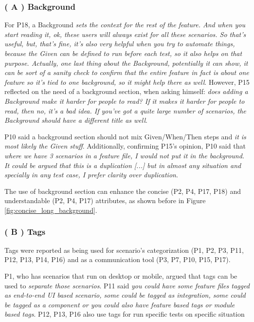 \subsubsection{\textbf{( A ) Background}}
For P18, a Background \textit{sets the context for the rest of the feature. And when you start reading it, ok, these users will always exist for all these scenarios. So that's useful, but, that's fine, it's also very helpful when you try to automate things, because the Given can be defined to run before each test, so it also helps on that purpose. Actually, one last thing about the Background, potentially it can show, it can be sort of a sanity check to confirm that the entire feature in fact is about one feature so it's tied to one background, so it might help there as well}. However, P15 reflected on the need of a background section, when asking himself: \textit{does adding a Background make it harder for people to read? If it makes it harder for people to read, then no, it's a bad idea. If you've got a quite large number of scenarios, the Background should have a different title as well}. 

P10 said a background section should not mix Given/When/Then steps and \textit{it is most likely the Given stuff}. Additionally, confirming P15's opinion, P10 said that \textit{where we have 3 scenarios in a feature file, I would not put it in the background. It could be argued that this is a duplication [...] but in almost any situation and specially in any test case, I prefer clarity over duplication}.

The use of background section can enhance the concise (P2, P4, P17, P18) and understandable (P2, P4, P17) attributes, as shown before in Figure \ref{fig:concise_long_background}.

\subsubsection{\textbf{( B ) Tags}}
Tags were reported as being used for scenario's categorization (P1, P2, P3, P11, P12, P13, P14, P16) and as a communication tool (P3, P7, P10, P15, P17).

P1, who has scenarios that run on desktop or mobile, argued that tags can be used to \textit{separate those scenarios}. P11 said \textit{you could have some feature files tagged as end-to-end UI based scenario, some could be tagged as integration, some could be tagged as a component or you could also have feature based tags or module based tags}. P12, P13, P16 also use tags for run specific tests on specific situation 

